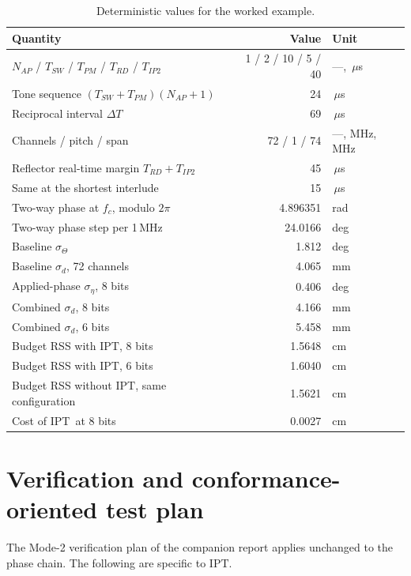 \documentclass[11pt,a4paper]{article}
\newcommand{\us}{\,\ensuremath{\upmu}s}
\newcommand{\IPT}{\ensuremath{\mathrm{IPT}}}
\newcommand{\Tsw}{T_{SW}}
\newcommand{\Tpm}{T_{PM}}
\newcommand{\Trd}{T_{RD}}
\newcommand{\Tiptwo}{T_{IP2}}
\newcommand{\Nap}{N_{AP}}
\providecommand{\upmu}{\mu}
\begin{document}
\begin{table}[h]
\caption{Deterministic values for the worked example.}
\label{tab:exvalues}
\centering\small
\begin{tabular}{@{}L{62mm}rl@{}}
\toprule
Quantity & Value & Unit \\
\midrule
$\Nap$ / $\Tsw$ / $\Tpm$ / $\Trd$ / $\Tiptwo$ & 1 / 2 / 10 / 5 / 40 & ---, \us \\
Tone sequence $(\Tsw+\Tpm)(\Nap+1)$ & 24 & \us \\
Reciprocal interval $\Delta T$ & 69 & \us \\
Channels / pitch / span & 72 / 1 / 74 & ---, MHz, MHz \\
Reflector real-time margin $\Trd+\Tiptwo$ & 45 & \us \\
Same at the shortest interlude & 15 & \us \\
Two-way phase at $f_c$, modulo $2\pi$ & 4.896351 & rad \\
Two-way phase step per 1\,MHz & 24.0166 & deg \\
Baseline $\sigma_\Theta$ & 1.812 & deg \\
Baseline $\sigma_d$, 72 channels & 4.065 & mm \\
Applied-phase $\sigma_\eta$, 8 bits & 0.406 & deg \\
Combined $\sigma_d$, 8 bits & 4.166 & mm \\
Combined $\sigma_d$, 6 bits & 5.458 & mm \\
Budget RSS with \IPT, 8 bits & 1.5648 & cm \\
Budget RSS with \IPT, 6 bits & 1.6040 & cm \\
Budget RSS without \IPT, same configuration & 1.5621 & cm \\
Cost of \IPT\ at 8 bits & 0.0027 & cm \\
\bottomrule
\end{tabular}
\end{table}
\section{Verification and conformance-oriented test plan}
\label{sec:verify}

The Mode-2 verification plan of the companion report applies unchanged to the phase chain. The
following are specific to \IPT.
\end{document}
